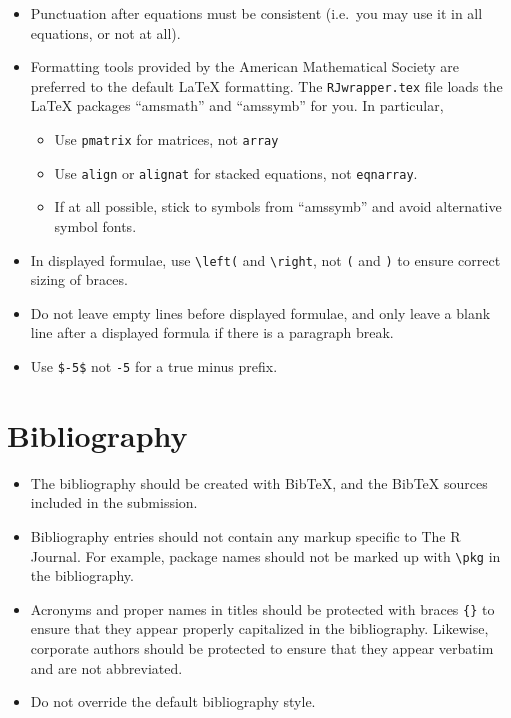 \documentclass[11pt]{article}
\begin{document}
\begin{itemize}
\item Punctuation after equations must be consistent (i.e.\ you may
  use it in all equations, or not at all).
\item Formatting tools provided by the American Mathematical Society
  are preferred to the default LaTeX formatting. The
  \texttt{RJwrapper.tex} file loads the LaTeX packages ``amsmath'' and
  ``amssymb'' for you. In particular,
  \begin{itemize}
  \item Use \verb+pmatrix+ for matrices, not \verb+array+
  \item Use \verb+align+ or \verb+alignat+ for stacked equations,
    not \verb+eqnarray+.
  \item If at all possible, stick to symbols from ``amssymb'' and
    avoid alternative symbol fonts.
  \end{itemize}
\item In displayed formulae, use \verb+\left(+ and \verb+\right+, not
  \verb+(+ and \verb+)+ to ensure correct sizing of braces.
\item Do not leave empty lines before displayed formulae, and only
  leave a blank line after a displayed formula if there is a paragraph
  break.
\item Use \verb+$-5$+ not \verb+-5+ for a true minus prefix.
\end{itemize}

\section*{Bibliography}

\begin{itemize}
\item The bibliography should be created with BibTeX, and the BibTeX
  sources included in the submission.
\item Bibliography entries should not contain any markup specific to
  The R Journal. For example, package names should not be marked up
  with \verb+\pkg+ in the bibliography.
\item Acronyms and proper names in titles should be protected with
  braces \verb+{}+ to ensure that they appear properly capitalized
  in the bibliography. Likewise, corporate authors should be
  protected to ensure that they appear verbatim and are not abbreviated.
\item Do not override the default bibliography style.
\end{itemize}
\end{document}
